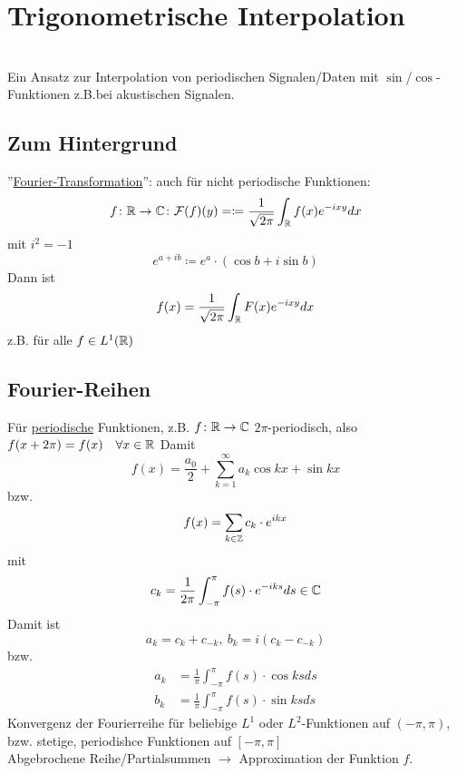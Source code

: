 \documentclass[../Skript.tex]{subfiles}
\begin{document}
\section{Trigonometrische Interpolation}\hfill\\
Ein Ansatz zur Interpolation von periodischen Signalen/Daten mit $\sin{}$/$\cos{}$-Funktionen z.B.bei akustischen 
Signalen.\\
\subsection{Zum Hintergrund} ''\underline{Fourier-Transformation}'': auch für nicht periodische Funktionen:
\[
f\colon \mathbb{R} \to \mathbb{C} \colon \mathcal{F}(f)(y)=\coloneqq \frac{1}{\sqrt{2\pi}}\int_{\mathbb{R}} f(x)e^{-ixy} dx
\]
mit $i^2=-1$
\[
e^{a+ib}\coloneqq e^a\cdot(\cos{b}+i\sin{b})
\]
Dann ist
\[
f(x)=\frac{1}{\sqrt{2\pi}}\int_{\mathbb{R}} F(x)e^{-ixy} dx
\]
z.B. für alle $f\in L^1 (\mathbb{R})$\\
\subsection{Fourier-Reihen}
Für \underline{periodische} Funktionen, z.B. \(f\colon\mathbb{R}\to\mathbb{C}\) \(2\pi\)-periodisch, also \(f(x+2\pi)=f(x)\quad \forall x \in \mathbb{R}\)
Damit\[
f(x)=\frac{a_0}{2}+\sum^\infty_{k=1}a_k\cos{kx}+\sin{kx}
\]
bzw.\[
f(x)=\sum_{k\in\mathbb{Z}}c_k\cdot e^{ikx}
\]
mit\[
c_k=\frac{1}{2\pi}\int_{-\pi}^\pi f(s)\cdot e^{-iks}ds\in \mathbb{C} 
\]
Damit ist\[
a_k=c_k+c_{-k},\ b_k=i(c_k-c_{-k})
\]
bzw.
\begin{align*}
  a_k&=\frac{1}{\pi}\int_{-\pi}^\pi f(s)\cdot \cos{ks}ds \\
  b_k&=\frac{1}{\pi}\int_{-\pi}^\pi f(s)\cdot \sin{ks}ds
\end{align*}
Konvergenz der Fourierreihe für beliebige \(L^1\) oder \(L^2\)-Funktionen auf \((-\pi,\pi)\), bzw. stetige, periodishce 
Funktionen auf \([-\pi,\pi]\)\\
Abgebrochene Reihe/Partialsummen $\to$ Approximation der Funktion $f$.
\end{document}
